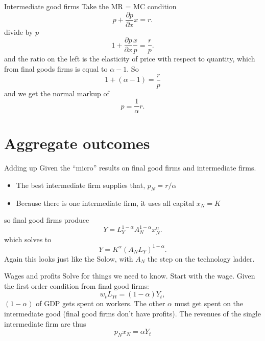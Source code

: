 \begin{frame}{Intermediate good firms}
Take the MR = MC condition
\begin{equation}
	p + \frac{\partial p}{\partial x}x = r. \nonumber
\end{equation}
divide by $p$
\begin{equation}
	1 + \frac{\partial p}{\partial x}\frac{x}{p} = \frac{r}{p}. \nonumber
\end{equation}
and the ratio on the left is the elasticity of price with respect to quantity, which from final goods firms is equal to $\alpha - 1$. So
\begin{equation}
	1 + (\alpha-1) = \frac{r}{p} \nonumber
\end{equation}
and we get the normal markup of
\begin{equation}
	p = \frac{1}{\alpha}r. \label{EQ_markup}
\end{equation}
\end{frame}

\section{Aggregate outcomes}
\begin{frame}{Adding up}
Given the ``micro'' results on final good firms and intermediate firms.
\begin{itemize}
	\item The best intermediate firm supplies that, $p_N = r/\alpha$
	\item Because there is one intermediate firm, it uses all capital $x_N = K$
\end{itemize}
so final good firms produce
\begin{equation}
	Y = L_Y^{1-\alpha} A_N^{1-\alpha} x_N^{\alpha}.
\end{equation}
which solves to
\begin{equation}
	Y = K^{\alpha} (A_N L_Y)^{1-\alpha}.
\end{equation}
Again this looks just like the Solow, with $A_N$ the step on the technology ladder. 
\end{frame}

\begin{frame}{Wages and profits}
Solve for things we need to know. Start with the wage. Given the first order condition from final good firms:
\begin{equation}
	w_t L_{Yt} = (1-\alpha)Y_t, \nonumber
\end{equation}
$(1-\alpha)$ of GDP gets spent on workers. The other $\alpha$ must get spent on the intermediate good (final good firms don't have profits). The revenues of the single intermediate firm are thus
\begin{equation}
	p_N x_N = \alpha Y_t
\end{equation}
\end{frame}

